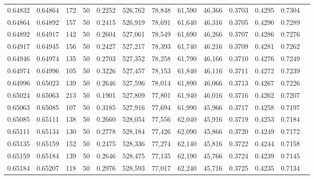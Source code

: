 \begin{tabular}{rrrrrrrrrrrrr}
0.64832 & 0.64864 &   172 &  50 &                                     0.2252 & 526,762 &  78,848 &  61,590 &  46,366 & 0.3703 & 0.4295 & 0.7304 \\
0.64864 & 0.64892 &   157 &  50 &                                     0.2415 & 526,919 &  78,691 &  61,640 &  46,316 & 0.3705 & 0.4290 & 0.7289 \\
0.64892 & 0.64917 &   142 &  50 &                                     0.2604 & 527,061 &  78,549 &  61,690 &  46,266 & 0.3707 & 0.4286 & 0.7276 \\
0.64917 & 0.64945 &   156 &  50 &                                     0.2427 & 527,217 &  78,393 &  61,740 &  46,216 & 0.3709 & 0.4281 & 0.7262 \\
0.64946 & 0.64974 &   135 &  50 &                                     0.2703 & 527,352 &  78,258 &  61,790 &  46,166 & 0.3710 & 0.4276 & 0.7249 \\
0.64974 & 0.64996 &   105 &  50 &                                     0.3226 & 527,457 &  78,153 &  61,840 &  46,116 & 0.3711 & 0.4272 & 0.7239 \\
0.64996 & 0.65023 &   139 &  50 &                                     0.2646 & 527,596 &  78,014 &  61,890 &  46,066 & 0.3713 & 0.4267 & 0.7226 \\
0.65024 & 0.65063 &   213 &  50 &                                     0.1901 & 527,809 &  77,801 &  61,940 &  46,016 & 0.3716 & 0.4262 & 0.7207 \\
0.65063 & 0.65085 &   107 &  50 &                                     0.3185 & 527,916 &  77,694 &  61,990 &  45,966 & 0.3717 & 0.4258 & 0.7197 \\
0.65085 & 0.65111 &   138 &  50 &                                     0.2660 & 528,054 &  77,556 &  62,040 &  45,916 & 0.3719 & 0.4253 & 0.7184 \\
0.65111 & 0.65134 &   130 &  50 &                                     0.2778 & 528,184 &  77,426 &  62,090 &  45,866 & 0.3720 & 0.4249 & 0.7172 \\
0.65135 & 0.65159 &   152 &  50 &                                     0.2475 & 528,336 &  77,274 &  62,140 &  45,816 & 0.3722 & 0.4244 & 0.7158 \\
0.65159 & 0.65184 &   139 &  50 &                                     0.2646 & 528,475 &  77,135 &  62,190 &  45,766 & 0.3724 & 0.4239 & 0.7145 \\
0.65184 & 0.65207 &   118 &  50 &                                     0.2976 & 528,593 &  77,017 &  62,240 &  45,716 & 0.3725 & 0.4235 & 0.7134 \\

\end{tabular}

